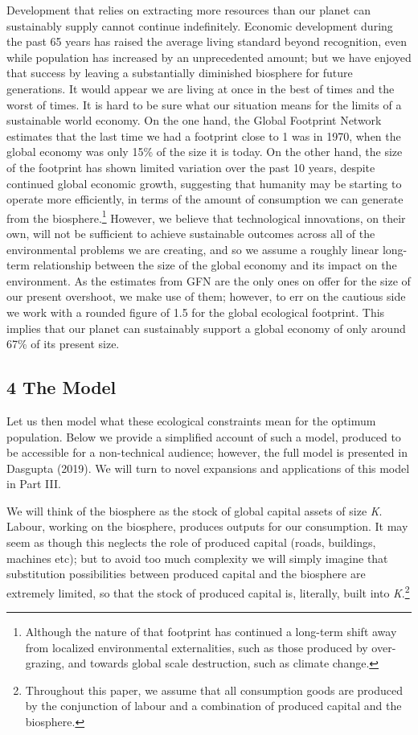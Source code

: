 \documentclass[man,11pt,a4paper,floatsintext]{apa7}
\begin{document}
Development that relies on extracting more resources than our planet can sustainably supply cannot continue indefinitely. Economic development during the past 65 years has raised the average living standard beyond recognition, even while population has increased by an unprecedented amount; but we have enjoyed that success by leaving a substantially diminished biosphere for future generations. It would appear we are living at once in the best of times and the worst of times. It is hard to be sure what our situation means for the limits of a sustainable world economy. On the one hand, the Global Footprint Network estimates that the last time we had a footprint close to 1 was in 1970, when the global economy was only 15\% of the size it is today. On the other hand, the size of the footprint has shown limited variation over the past 10 years, despite continued global economic growth, suggesting that humanity may be starting to operate more efficiently, in terms of the amount of consumption we can generate from the biosphere.\footnote{Although the nature of that footprint has continued a long-term shift away from localized environmental externalities, such as those produced by over-grazing, and towards global scale destruction, such as climate change.} However, we believe that technological innovations, on their own, will not be sufficient to achieve sustainable outcomes across all of the environmental problems we are creating, and so we assume a roughly linear long-term relationship between the size of the global economy and its impact on the environment. As the estimates from GFN are the only ones on offer for the size of our present overshoot, we make use of them; however, to err on the cautious side we work with a rounded figure of 1.5 for the global ecological footprint. This implies that our planet can sustainably support a global economy of only around 67\% of its present size.

\subsection{4 The Model}

Let us then model what these ecological constraints mean for the optimum population. Below we provide a simplified account of such a model, produced to be accessible for a non-technical audience; however, the full model is presented in Dasgupta (2019). We will turn to novel expansions and applications of this model in Part III.

We will think of the biosphere as the stock of global capital assets of size \textit{K}. Labour, working on the biosphere, produces outputs for our consumption. It may seem as though this neglects the role of produced capital (roads, buildings, machines etc); but to avoid too much complexity we will simply imagine that substitution possibilities between produced capital and the biosphere are extremely limited, so that the stock of produced capital is, literally, built into \textit{K}.\footnote{Throughout this paper, we assume that all consumption goods are produced by the conjunction of labour and a combination of produced capital and the biosphere.}
\end{document}
